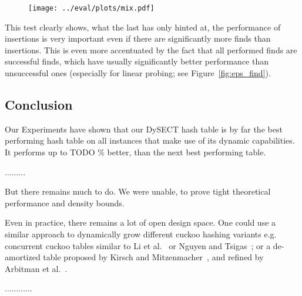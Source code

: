 \documentclass[a4paper,UKenglish]{lipics-v2016}
\begin{document}
\begin{figure}[ht]
  \centering
  \texttt{[image: ../eval/plots/mix.pdf]}
  \caption{\label{fig:mix} }
\end{figure}

This test clearly shows, what the last has only hinted at, the
performance of insertions is very important even if there are
significantly more finds than insertions.  This is even more
accentuated by the fact that all performed finds are successful finds,
which have usually significantly better performance than unsuccessful
ones (especially for linear probing; see Figure~\ref{fig:eps_find}).

\subsection{Conclusion}
Our Experiments have shown that our DySECT hash table is by far the
best performing hash table on all instances that make use of its
dynamic capabilities.  It performs up to TODO $\%$ better, than the
next best performing table.


.........


But there remains much to do. We were unable, to prove tight
theoretical performance and density bounds.

Even in practice, there remains a lot of open design space.  One could
use a similar approach to dynamically grow different cuckoo hashing
variants e.g. concurrent cuckoo tables similar to Li et
al.~\cite{AlgorithmicImprovementsForFastConcurrentCuckooHashing} or
Nguyen and Tsigas~\cite{LockFreeCuckooHashing}; or a de-amortized
table proposed by Kirsch and
Mitzenmacher~\cite{UsingAQueueToDeAmortizeCuckooHashingInHardware},
and refined by Arbitman et
al.~\cite{DeAmortizedCuckooHashingProvableWorstCasePerformanceAndExperimentalResults}.

............





\end{document}
